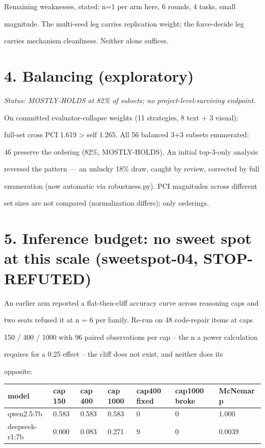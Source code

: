 \documentclass[11pt]{article}
\begin{document}
Remaining weaknesses, stated: n=1 per arm here, 6 rounds, 4 tasks, small

magnitude. The multi-seed leg carries replication weight; the force-decide leg

carries mechanism cleanliness. Neither alone suffices.


\section*{4. Balancing (exploratory)}

{\it Status: MOSTLY-HOLDS at 82\% of subsets; no project-level-surviving endpoint.}


On committed evaluator-collapse weights (11 strategies, 8 text + 3 visual):

full-set cross PCI 1.619 > self 1.265. All 56 balanced 3+3 subsets enumerated:

46 preserve the ordering (82\%, MOSTLY-HOLDS). An initial top-3-only analysis

reversed the pattern --- an unlucky 18\% draw, caught by review, corrected by full

enumeration (now automatic via robustness.py). PCI magnitudes across different

set sizes are not compared (normalization differs); only orderings.


\section*{5. Inference budget: no sweet spot at this scale (sweetspot-04, STOP-REFUTED)}

An earlier arm reported a flat-then-cliff accuracy curve across reasoning caps and

two seats refused it at n = 6 per family. Re-run on 48 code-repair items at caps

150 / 400 / 1000 with 96 paired observations per cap -- the n a power calculation

requires for a 0.25 effect -- the cliff does not exist, and neither does its

opposite:


\begin{center}\small\begin{tabular}{lllllll}\hline
model & cap 150 & cap 400 & cap 1000 & cap400 fixed & cap1000 broke & McNemar p \\
\hline
qwen2.5:7b & 0.583 & 0.583 & 0.583 & 0 & 0 & 1.000 \\
deepseek-r1:7b & 0.000 & 0.083 & 0.271 & 9 & 0 & 0.0039 \\
\end{tabular}\end{center}
\end{document}
